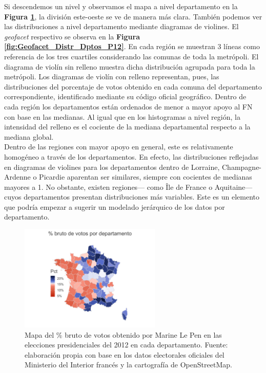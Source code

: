 Si descendemos un nivel y observamos el mapa a nivel departamento en la \textbf{Figura \ref{fig:Pct_Br_Dptos_P12}}, la división este-oeste se ve de manera más clara. También podemos ver las distribuciones a nivel departamento mediante diagramas de violines. El \textit{geofacet} respectivo se observa en la \textbf{Figura \ref{fig:Geofacet_Distr_Dptos_P12}}. En cada región se muestran 3 líneas como referencia de los tres cuartiles considerando las comunas de toda la metrópoli. El diagrama de violín sin relleno muestra dicha distribución agrupada para toda la metrópoli. Los diagramas de violín con relleno representan, pues, las distribuciones del porcentaje de votos obtenido en cada comuna del departamento correspondiente, identificado mediante su código oficial geográfico. Dentro de cada región los departamentos están ordenados de menor a mayor apoyo al FN con base en las medianas. Al igual que en los histogramas a nivel región, la intensidad del relleno es el cociente de la mediana departamental respecto a la mediana global.\\ 

Dentro de las regiones con mayor apoyo en general, este es relativamente homogéneo a través de los departamentos. En efecto, las distribuciones reflejadas en diagramas de violines para los departamentos dentro de Lorraine, Champagne-Ardenne o Picardie aparentan ser similares, siempre con cocientes de medianas mayores a 1. No obstante, existen regiones--- como Île de France o Aquitaine--- cuyos departamentos presentan distribuciones más variables. Este es un elemento que podría empezar a sugerir un modelado jerárquico de los datos por departamento.\\

\begin{figure}[H]
	\centering
	\includegraphics[width = 0.6\textwidth]{Figs/AED/Pct_Br_Dpto_P12_FN}
	\caption{Mapa del \% bruto de votos obtenido por Marine Le Pen en las elecciones presidenciales del 2012 en cada departamento. Fuente: elaboración propia con base en los datos electorales oficiales del Ministerio del Interior francés y la cartografía de OpenStreetMap.}
	\label{fig:Pct_Br_Dptos_P12}
\end{figure}
	
